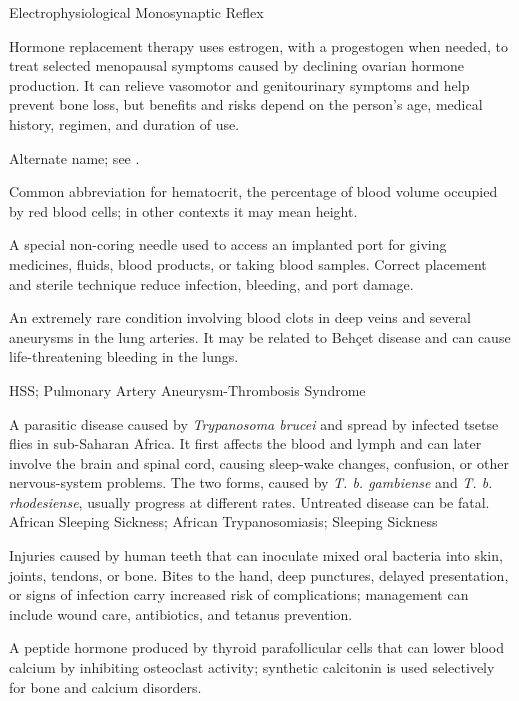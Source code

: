\synonyms
Electrophysiological Monosynaptic Reflex

 Hormone replacement therapy uses estrogen, with a progestogen when needed, to treat selected menopausal
symptoms caused by declining ovarian hormone production. It can relieve vasomotor and
genitourinary symptoms and help prevent bone loss, but benefits and risks depend on the
person’s age, medical history, regimen, and duration of use.

 Alternate name; see .

 Common abbreviation for hematocrit, the percentage of blood volume occupied by red blood cells; in other contexts it may mean height.

 A special non-coring needle used to access an implanted port for giving medicines, fluids, blood products, or taking blood samples. Correct placement and sterile technique reduce infection, bleeding, and port damage.

 An extremely rare condition involving blood clots in deep veins and several aneurysms in the lung arteries. It may be related to Beh\c{c}et disease and can cause life-threatening bleeding in the lungs.

\synonyms
HSS; Pulmonary Artery Aneurysm-Thrombosis Syndrome

 A parasitic disease caused by \textit{Trypanosoma brucei} and spread by infected tsetse flies in sub-Saharan Africa. It first affects the blood and lymph and can later involve the brain and spinal cord, causing sleep-wake changes, confusion, or other nervous-system problems. The two forms, caused by \textit{T. b. gambiense} and \textit{T. b. rhodesiense}, usually progress at different rates. Untreated disease can be fatal.
\synonyms
African Sleeping Sickness; African Trypanosomiasis; Sleeping Sickness

 Injuries caused by human teeth that can inoculate mixed oral bacteria into skin, joints, tendons, or bone. Bites to the hand, deep punctures, delayed presentation, or signs of infection carry increased risk of complications; management can include wound care, antibiotics, and tetanus prevention.

 A peptide hormone produced by thyroid parafollicular cells that can lower blood calcium by inhibiting osteoclast activity; synthetic calcitonin is used selectively for bone and calcium disorders.

